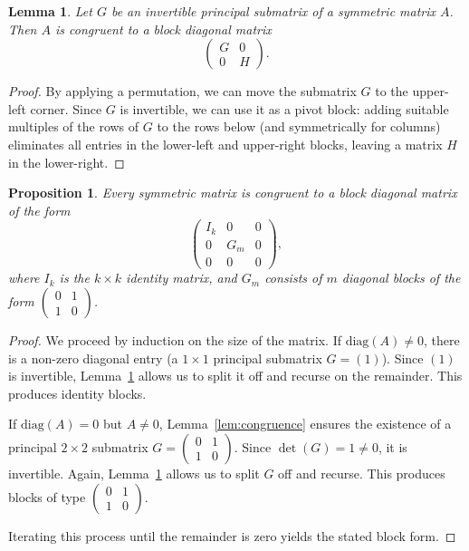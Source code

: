 \documentclass[11pt,a4paper]{article}
\newtheorem{proposition}[theorem]{Proposition}
\newtheorem{lemma}[theorem]{Lemma}
\theoremstyle{definition}
\begin{document}
\begin{lemma}\label{lem:invertible_sub}
	Let $G$ be an invertible principal submatrix of a symmetric matrix $A$.
	Then $A$ is congruent to a block diagonal matrix
	\[
	\begin{pmatrix}
		G & 0 \\[0.2em]
		0 & H
	\end{pmatrix}.
	\]
\end{lemma}

\begin{proof}
	By applying a permutation, we can move the submatrix $G$ to the upper-left corner.
	Since $G$ is invertible, we can use it as a pivot block: adding suitable multiples of the rows of $G$ to the rows below (and symmetrically for columns) eliminates all entries in the lower-left and upper-right blocks, leaving a matrix $H$ in the lower-right.
\end{proof}

\begin{proposition}\label{prop:full_principal}
	Every symmetric matrix is congruent to a block diagonal matrix of the form
	\[
	\begin{pmatrix}
		I_k & 0 & 0 \\[0.2em]
		0 & G_m &0\\[0.2em]
		0 & 0 & 0
	\end{pmatrix},
	\]
	where $I_k$ is the $k \times k$ identity matrix, and $G_m$ consists of $m$ diagonal blocks of the form $\begin{pmatrix} 0 & 1 \\ 1 & 0 \end{pmatrix}$.
\end{proposition}

\begin{proof}
	We proceed by induction on the size of the matrix.
	If $\mathrm{diag}(A) \neq 0$, there is a non-zero diagonal entry (a $1 \times 1$ principal submatrix $G=(1)$). Since $(1)$ is invertible, Lemma~\ref{lem:invertible_sub} allows us to split it off and recurse on the remainder. This produces identity blocks.
	
	If $\mathrm{diag}(A) = 0$ but $A \neq 0$, Lemma~\ref{lem:congruence} ensures the existence of a principal $2 \times 2$ submatrix $G = \begin{pmatrix} 0 & 1 \\ 1 & 0 \end{pmatrix}$. Since $\det(G) = 1 \neq 0$, it is invertible. Again, Lemma~\ref{lem:invertible_sub} allows us to split $G$ off and recurse. This produces blocks of type $\begin{pmatrix} 0 & 1 \\ 1 & 0 \end{pmatrix}$.
	
	Iterating this process until the remainder is zero yields the stated block form.
\end{proof}
\end{document}
